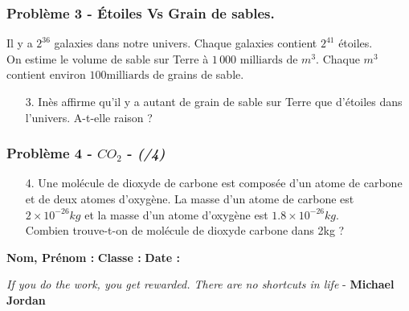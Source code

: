 \documentclass[10pt]{article}
\begin{document}
\subsubsection*{Problème 3 - Étoiles Vs Grain de sables.}

Il y a $2^{36}$ galaxies dans notre univers. Chaque galaxies contient $2^{41}$ étoiles.  \\
On estime le volume de sable sur Terre à $1\,000 \text{ milliards de } m^3$. Chaque $m^3$ contient environ $100 \text{milliards}$ de grains de sable. 

\begin{itemize}
\item[3.] Inès affirme qu'il y a autant de grain de sable sur Terre que d'étoiles dans l'univers. A-t-elle raison ? 
\end{itemize}



\subsubsection*{Problème 4 - $CO_2$  - \textit{(/4)}}

\begin{enumerate}
  \item[4.] Une molécule de dioxyde de carbone est composée d'un atome de carbone et de deux atomes d'oxygène. La masse d'un atome de carbone est $2 \times 10^{-26}kg$ et la masse d'un atome d'oxygène est $1.8 \times 10^{-26}kg$. \\
  Combien trouve-t-on de molécule de dioxyde carbone dans 2kg ?
\end{enumerate}


\newpage



\textbf{Nom, Prénom :} \hspace{8cm} \textbf{Classe :} \hspace{3cm} \textbf{Date :}\\

\begin{center}
  \textit{If you do the work, you get rewarded. There are no shortcuts in life}  - \textbf{Michael Jordan}
\end{center}
\end{document}
